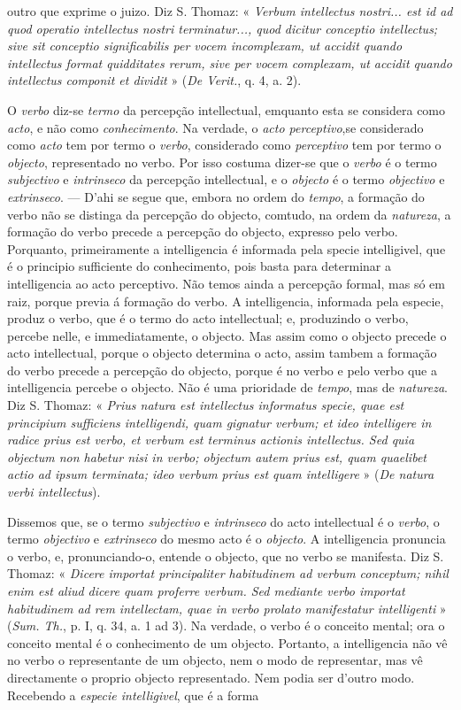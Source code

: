 outro que exprime o juizo. Diz S. Thomaz: « \emph{Verbum intellectus nostri... est id ad quod operatio intellectus nostri terminatur..., quod dicitur conceptio intellectus; sive sit conceptio significabilis per vocem incomplexam, ut accidit quando intellectus format quidditates rerum, sive per vocem complexam, ut accidit quando intellectus componit et dividit} » (\emph{De Verit.}, q. 4, a. 2).\par O \emph{verbo} diz-se \emph{termo} da percepção intellectual, emquanto esta se considera como \emph{acto}, e não como \emph{conhecimento}. Na verdade, o \emph{acto perceptivo},se considerado como \emph{acto} tem por termo o \emph{verbo}, considerado como \emph{perceptivo} tem por termo o \emph{objecto}, representado no verbo. Por isso costuma dizer-se que o \emph{verbo} é o termo \emph{subjectivo} e \emph{intrinseco} da percepção intellectual, e o \emph{objecto} é o termo \emph{objectivo} e \emph{extrinseco}. --- D'ahi se segue que, embora no ordem do \emph{tempo}, a formação do verbo não se distinga da percepção do objecto, comtudo, na ordem da \emph{natureza}, a formação do verbo precede a percepção do objecto, expresso pelo verbo. Porquanto, primeiramente a intelligencia é informada pela specie intelligivel, que é o principio sufficiente do conhecimento, pois basta para determinar a intelligencia ao acto perceptivo. Não temos ainda a percepção formal, mas só em raiz, porque previa á formação do verbo. A intelligencia, informada pela especie, produz o verbo, que é o termo do acto intellectual; e, produzindo o verbo, percebe nelle, e immediatamente, o objecto. Mas assim como o objecto precede o acto intellectual, porque o objecto determina o acto, assim tambem a formação do verbo precede a percepção do objecto, porque é no verbo e pelo verbo que a intelligencia percebe o objecto. Não é uma prioridade de \emph{tempo}, mas de \emph{natureza}. Diz S. Thomaz: « \emph{Prius natura est intellectus informatus specie, quae est principium sufficiens intelligendi, quam gignatur verbum; et ideo intelligere in radice prius est verbo, et verbum est terminus actionis intellectus. Sed quia objectum non habetur nisi in verbo; objectum autem prius est, quam quaelibet actio ad ipsum terminata; ideo verbum prius est quam intelligere} » (\emph{De natura verbi intellectus}).\par Dissemos que, se o termo \emph{subjectivo} e \emph{intrinseco} do acto intellectual é o \emph{verbo}, o termo \emph{objectivo} e \emph{extrinseco} do mesmo acto é o \emph{objecto}. A intelligencia pronuncia o verbo, e, pronunciando-o, entende o objecto, que no verbo se manifesta. Diz S. Thomaz: « \emph{Dicere importat principaliter habitudinem ad verbum conceptum; nihil enim est aliud dicere quam proferre verbum. Sed mediante verbo importat habitudinem ad rem intellectam, quae in verbo prolato manifestatur intelligenti} » (\emph{Sum. Th.}, p. I, q. 34, a. 1 ad 3). Na verdade, o verbo é o conceito mental; ora o conceito mental é o conhecimento de um objecto. Portanto, a intelligencia não vê no verbo o representante de um objecto, nem o modo de representar, mas vê directamente o proprio objecto representado. Nem podia ser d'outro modo. Recebendo a \emph{especie intelligivel}, que é a forma 